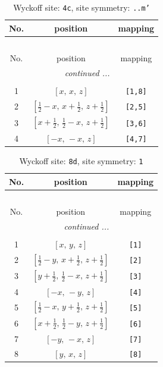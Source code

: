 \documentclass[fleqn,8pt]{jsarticle}
\begin{document}
\renewcommand{\arraystretch}{1.2}
\begin{longtable}{ccc}
\caption{Wyckoff site: {\tt 4c}, site symmetry: {\tt ..m'}}
 \\
 \hline \hline
No. & position & mapping \\ \hline \endfirsthead

\multicolumn{2}{l}{\tablename\ \thetable{}} \\
 \hline \hline
No. & position & mapping \\ \hline \endhead

 \hline \hline
\multicolumn{2}{r}{\footnotesize\it continued ...} \\ \endfoot

 \hline \hline
\multicolumn{2}{r}{} \\ \endlastfoot

1 & $\left[ x,\, x,\, z \right]$ & {\tt [1,8]} \\ \hline
2 & $\left[ \frac{1}{2} - x,\, x + \frac{1}{2},\, z + \frac{1}{2} \right]$ & {\tt [2,5]} \\ \hline
3 & $\left[ x + \frac{1}{2},\, \frac{1}{2} - x,\, z + \frac{1}{2} \right]$ & {\tt [3,6]} \\ \hline
4 & $\left[ - x,\, - x,\, z \right]$ & {\tt [4,7]} \\
\end{longtable}
\renewcommand{\arraystretch}{1.2}
\begin{longtable}{ccc}
\caption{Wyckoff site: {\tt 8d}, site symmetry: {\tt 1}}
 \\
 \hline \hline
No. & position & mapping \\ \hline \endfirsthead

\multicolumn{2}{l}{\tablename\ \thetable{}} \\
 \hline \hline
No. & position & mapping \\ \hline \endhead

 \hline \hline
\multicolumn{2}{r}{\footnotesize\it continued ...} \\ \endfoot

 \hline \hline
\multicolumn{2}{r}{} \\ \endlastfoot

1 & $\left[ x,\, y,\, z \right]$ & {\tt [1]} \\ \hline
2 & $\left[ \frac{1}{2} - y,\, x + \frac{1}{2},\, z + \frac{1}{2} \right]$ & {\tt [2]} \\ \hline
3 & $\left[ y + \frac{1}{2},\, \frac{1}{2} - x,\, z + \frac{1}{2} \right]$ & {\tt [3]} \\ \hline
4 & $\left[ - x,\, - y,\, z \right]$ & {\tt [4]} \\ \hline
5 & $\left[ \frac{1}{2} - x,\, y + \frac{1}{2},\, z + \frac{1}{2} \right]$ & {\tt [5]} \\ \hline
6 & $\left[ x + \frac{1}{2},\, \frac{1}{2} - y,\, z + \frac{1}{2} \right]$ & {\tt [6]} \\ \hline
7 & $\left[ - y,\, - x,\, z \right]$ & {\tt [7]} \\ \hline
8 & $\left[ y,\, x,\, z \right]$ & {\tt [8]} \\
\end{longtable}
\end{document}
